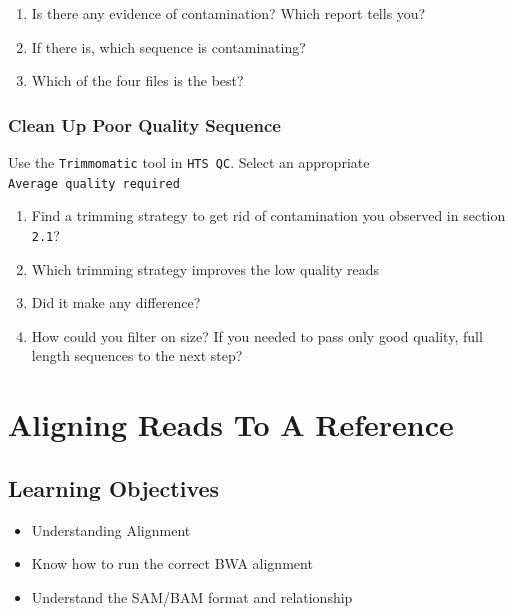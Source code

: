 \documentclass[12pt,]{book}
\providecommand{\tightlist}{%
  \setlength{\itemsep}{0pt}\setlength{\parskip}{0pt}}
\begin{document}
\begin{enumerate}
\def\labelenumi{\arabic{enumi}.}
\tightlist
\item
  Is there any evidence of contamination? Which report tells you?
\item
  If there is, which sequence is contaminating?
\item
  Which of the four files is the best?
\end{enumerate}

\subsection{Clean Up Poor Quality
Sequence}\label{clean-up-poor-quality-sequence}

Use the \texttt{Trimmomatic} tool in \texttt{HTS\ QC}. Select an
appropriate \texttt{Average\ quality\ required}

\begin{enumerate}
\def\labelenumi{\arabic{enumi}.}
\tightlist
\item
  Find a trimming strategy to get rid of contamination you observed in
  section \texttt{2.1}?
\item
  Which trimming strategy improves the low quality reads
\item
  Did it make any difference?
\item
  How could you filter on size? If you needed to pass only good quality,
  full length sequences to the next step?
\end{enumerate}

\chapter{Aligning Reads To A
Reference}\label{aligning-reads-to-a-reference}

\section{Learning Objectives}\label{learning-objectives-2}

\begin{itemize}
\tightlist
\item
  Understanding Alignment
\item
  Know how to run the correct BWA alignment
\item
  Understand the SAM/BAM format and relationship
\end{itemize}
\end{document}
